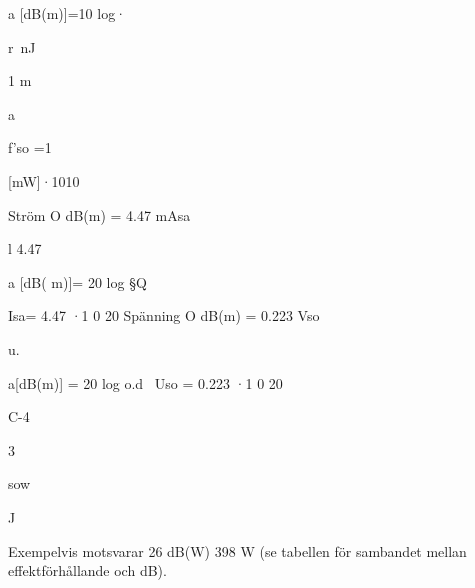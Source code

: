 a [dB(m)]=10 log·

r~nJ

1 m

a

f'so =1

[mW]·1010

Ström
O dB(m) = 4.47 mAsa

l
4.47

a [dB( m)]= 20 log §Q

Isa= 4.47 ·1 0 20
Spänning
O dB(m) = 0.223 Vso

u.

a[dB(m)] = 20 log o.d~
Uso = 0.223 ·1 0 20

C-4

3

sow

J

Exempelvis motsvarar 26 dB(W) 398 W
(se tabellen för sambandet mellan effektförhållande och dB).
